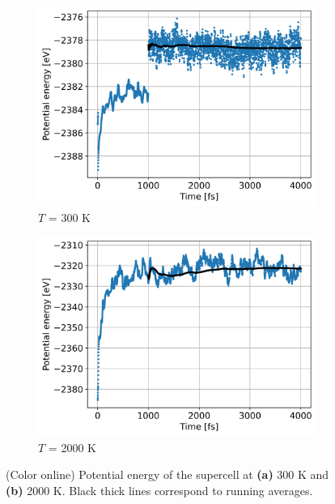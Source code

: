 \documentclass[preprint, 12pt]{elsarticle}
\newcommand{\?}{\stackrel{?}{=}}
\begin{document}
\begin{figure}[h!]
\centering
\begin{subfigure}{0.48\textwidth}
    \includegraphics[width=\textwidth]{300-PE.png}
    \caption{$T$ = 300 K}
    \label{Fig:300-PE}
\end{subfigure}
\hfill
\begin{subfigure}{0.48\textwidth}
    \includegraphics[width=\textwidth]{2000-PE.png}
    \caption{$T$ = 2000 K}
    \label{Fig:2000-PE}
\end{subfigure}
\caption{(Color online) Potential energy of the supercell at \textbf{(a)} 300 K and \textbf{(b)} 2000 K. Black thick lines correspond to running averages.}
\label{fig:PE}
\end{figure}
\end{document}
